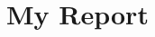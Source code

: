\documentclass{article}
\begin{document}
	
\section{My Report}

\lipsum[1]

\lipsum[2]

\lipsum[3]
\end{document}
